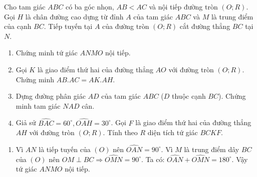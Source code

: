 \begin{ex}%
    Cho tam giác $ABC$ có ba góc nhọn, $AB<AC$ và nội tiếp đường tròn $(O;R)$. Gọi $H$ là chân đường cao dựng từ đỉnh $A$ của tam giác $ABC$ và $M$ là trung điểm của cạnh $BC$. Tiếp tuyến tại $A$ của đường tròn $(O;R)$ cắt đường thẳng $BC$ tại $N$.
    \begin{enumerate}[1.]
    	\item Chứng minh tứ giác $ANMO$ nội tiếp.
    	\item Gọi $K$ là giao điểm thứ hai của đường thẳng $AO$ với đường tròn $(O;R)$. Chứng minh $AB.AC=AK.AH$.
    	\item Dựng đường phân giác $AD$ của tam giác $ABC$ ($D$ thuộc cạnh $BC$). Chứng minh tam giác $NAD$ cân.
    	\item Giả sử $\widehat{BAC}=60^\circ, \widehat{OAH}=30^\circ$. Gọi $F$ là giao điểm thứ hai của đường thẳng $AH$ với đường tròn $(O;R)$. Tính theo $R$ diện tích tứ giác $BCKF$.
    \end{enumerate}
\loigiai
    {\begin{enumerate}[1.]
    	\item Vì $AN$ là tiếp tuyến của $(O)$ nên $\widehat{OAN}=90^\circ$.
    	Vì $M$ là trung điểm dây $BC$ của $(O)$ nên $OM\perp BC\Rightarrow \widehat{OMN}=90^\circ$. Ta có:  $\widehat{OAN}+\widehat{OMN}=180^\circ.$
    	Vậy tứ giác $ANMO$ nội tiếp.
    	    	\begin{center}
\end{center}
\end{enumerate}}
\end{ex}
